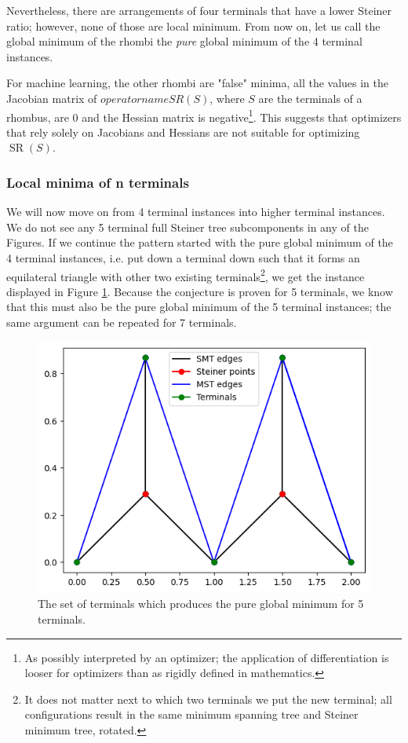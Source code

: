 \documentclass{mpaper}
\begin{document}
Nevertheless, there are arrangements of four terminals that have a lower Steiner ratio; however, none of those are local minimum. From now on, let us call the global minimum of the rhombi the  \emph{pure} global minimum of the 4 terminal instances. 

For machine learning, the other rhombi are "false" minima, all the values in the Jacobian matrix of $operatorname{SR}(S)$, where $S$ are the terminals of a rhombus, are 0 and the Hessian matrix is negative\footnote{As possibly interpreted by an optimizer; the application of differentiation is looser for optimizers than as rigidly defined in mathematics.}. This suggests that optimizers that rely solely on Jacobians and Hessians are not suitable for optimizing $\operatorname{SR}(S)$.

\subsubsection{Local minima of n terminals}
We will now move on from 4 terminal instances into higher terminal instances. We do not see any 5 terminal full Steiner tree subcomponents in any of the Figures. If we continue the pattern started with the pure global minimum of the 4 terminal instances, i.e. put down a terminal down such that it forms an equilateral triangle with other two existing terminals\footnote{It does not matter next to which two terminals we put the new terminal; all configurations result in the same minimum spanning tree and Steiner minimum tree, rotated.}, we get the instance displayed in Figure \ref{fig:13}. Because the conjecture is proven for 5 terminals, we know that this must also be the pure global minimum of the 5 terminal instances; the same argument can be repeated for 7 terminals.

\begin{figure}[h!]
  \begin{center}
  \includegraphics[scale=0.5]{plot12.png}
  \end{center}
  \caption{\label{fig:13} The set of terminals which produces the pure global minimum for 5 terminals.}
\end{figure}
\end{document}
